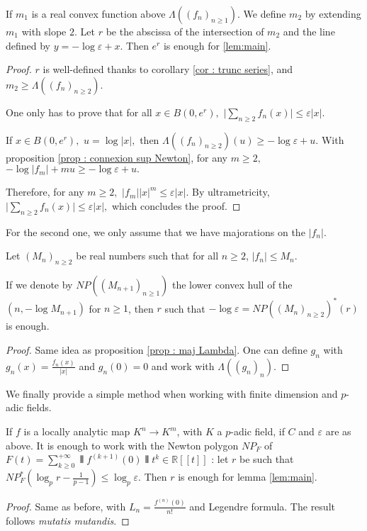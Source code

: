 \documentclass{lms}
\begin{document}
\begin{prop} \label{prop : maj Lambda} \label{prop:locanalytic}
If $m_1$ is a real convex function above $\Lambda((f_n)_{n \geq 1})$.
We define $m_2$ by extending $m_1$ with slope $2$.
Let $r$ be the abscissa of the intersection of $m_2$ and the line defined by $y=-\log \varepsilon+ x.$ Then $e^r$ is enough for \ref{lem:main}.
\end{prop}
\begin{proof}
$r$ is well-defined thanks to corollary \ref{cor : trunc series}, and $m_2 \geq \Lambda((f_n)_{n \geq 2}).$

One only has to prove that for all $x \in B(0,e^r),$ $\vert \sum_{n\geq 2} f_n(x) \vert \leq \varepsilon \vert x \vert.$

If $x \in B(0,e^r),$ $u = \log \vert x \vert,$ then $\Lambda((f_n)_{n \geq 2})(u) \geq -\log \varepsilon+ u.$
With proposition \ref{prop : connexion sup Newton}, for any $m \geq 2,$ $-\log \vert f_m \vert +m u \geq -\log \varepsilon+ u.$

Therefore, for any $m \geq 2,$ $\vert f_m \vert  \vert x \vert^m \leq \varepsilon \vert x \vert.$
By ultrametricity,   $\vert \sum_{n\geq 2} f_n(x) \vert \leq \varepsilon \vert x \vert,$ which concludes the proof.
\end{proof}

For the second one, we only assume that we have majorations on the $\vert f_n \vert.$

\begin{prop}
Let $(M_n)_{n \geq 2}$ be real numbers such that for all $n \geq 2$, $\vert f_n \vert \leq M_n.$

If we denote by $NP((M_{n+1})_{n \geq 1})$ the lower convex hull of the $(n, -\log M_{n+1})$ for $n \geq 1$, then $r$ such that $-\log \varepsilon=NP((M_n)_{n \geq 2})^*(r)$ is enough.
\end{prop}
\begin{proof}
Same idea as proposition \ref{prop : maj Lambda}. One can define $g_n$ with $g_n (x) =\frac{f_n(x)}{\vert x \vert}$ and $g_n(0)=0$ and work with $\Lambda ((g_n)_n).$
\end{proof}

We finally provide a simple method when working with finite dimension and $p$-adic fields.

\begin{prop} \label{prop : locanalyticfinitedim}
If $f$ is a locally analytic map $K^n \rightarrow K^m$, with $K$ a $p$-adic field, if $C$ and $\varepsilon$ are as above. It is enough to work with the Newton polygon $NP_F$ of $F(t) = \sum_{k\geq 0}^{+\infty} \interleave f^{(k+1)}(0) \interleave  t^k \in \mathbb{R}[[t]]$ : let $r$ be such that $NP_F^* \left( \log_p r - \frac{1}{p-1} \right) \leq \log_p \varepsilon.$ Then $r$ is enough for lemma \ref{lem:main}. 
\end{prop}
\begin{proof}
Same as before, with $L_n=\frac{f^{(n)}(0)}{n!}$ and Legendre formula. The result follows \textit{mutatis mutandis}.
\end{proof}
\end{document}
